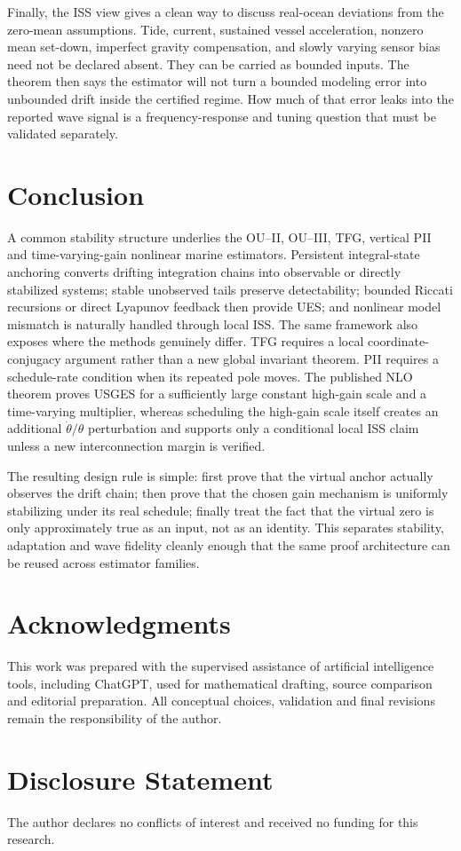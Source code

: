 \documentclass[conference]{IEEEtran}
\theoremstyle{remark}
\begin{document}
Finally, the ISS view gives a clean way to discuss real-ocean deviations from
the zero-mean assumptions.  Tide, current, sustained vessel acceleration,
nonzero mean set-down, imperfect gravity compensation, and slowly varying
sensor bias need not be declared absent.  They can be carried as bounded inputs.
The theorem then says the estimator will not turn a bounded modeling error into
unbounded drift inside the certified regime.  How much of that error leaks into
the reported wave signal is a frequency-response and tuning question that must
be validated separately.

\section{Conclusion}

A common stability structure underlies the OU--II, OU--III, TFG, vertical PII
and time-varying-gain nonlinear marine estimators.  Persistent integral-state
anchoring converts drifting integration chains into observable or directly
stabilized systems; stable unobserved tails preserve detectability; bounded
Riccati recursions or direct Lyapunov feedback then provide UES; and nonlinear
model mismatch is naturally handled through local ISS.  The same framework
also exposes where the methods genuinely differ.  TFG requires a local
coordinate-conjugacy argument rather than a new global invariant theorem.  PII
requires a schedule-rate condition when its repeated pole moves.  The published
NLO theorem proves USGES for a sufficiently large constant high-gain scale and a
time-varying multiplier, whereas scheduling the high-gain scale itself creates
an additional $\dot\theta/\theta$ perturbation and supports only a conditional
local ISS claim unless a new interconnection margin is verified.

The resulting design rule is simple: first prove that the virtual anchor
actually observes the drift chain; then prove that the chosen gain mechanism is
uniformly stabilizing under its real schedule; finally treat the fact that the
virtual zero is only approximately true as an input, not as an identity.  This
separates stability, adaptation and wave fidelity cleanly enough that the same
proof architecture can be reused across estimator families.

\section*{Acknowledgments}
This work was prepared with the supervised assistance of artificial intelligence
tools, including ChatGPT, used for mathematical drafting, source comparison and
editorial preparation.  All conceptual choices, validation and final revisions
remain the responsibility of the author.

\section*{Disclosure Statement}
The author declares no conflicts of interest and received no funding for this
research.



\end{document}
